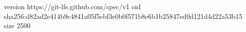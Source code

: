 version https://git-lfs.github.com/spec/v1
oid sha256:d82ad2e414b9c4841a05f5ebf3e0b0f571b8e6b1b25847ed0d121d4d22a53b15
size 2500
